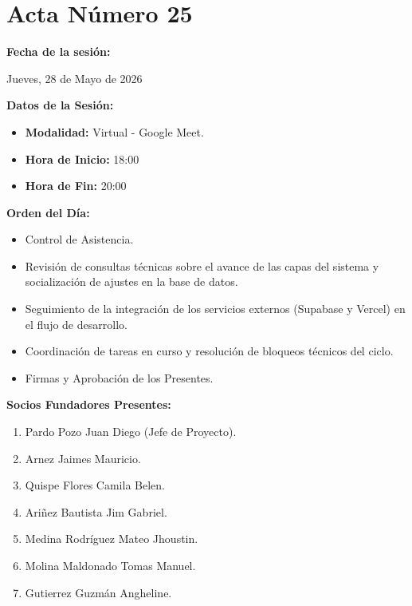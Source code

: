 \newpage
\section{Acta Número 25}
\label{sec:acta25}

\noindent \textbf{Fecha de la sesión:}\par
Jueves, 28 de Mayo de 2026

\vspace*{0.5cm}
\noindent \textbf{Datos de la Sesión:}
\vspace{-0.2cm}
\begin{itemize}[noitemsep]
\item \textbf{Modalidad:} Virtual - Google Meet.
\item \textbf{Hora de Inicio:} 18:00
\item \textbf{Hora de Fin:} 20:00
\end{itemize}

\vspace*{0.5cm}
\noindent \textbf{Orden del Día:}
\vspace{-0.2cm}
\begin{itemize}[noitemsep]
\item Control de Asistencia.
\item Revisión de consultas técnicas sobre el avance de las capas del sistema y socialización de ajustes en la base de datos.
\item Seguimiento de la integración de los servicios externos (Supabase y Vercel) en el flujo de desarrollo.
\item Coordinación de tareas en curso y resolución de bloqueos técnicos del ciclo.
\item Firmas y Aprobación de los Presentes.
\nobreak\end{itemize}

\vspace*{0.5cm}
\noindent \textbf{Socios Fundadores Presentes:}
\vspace{-0.2cm}
\begin{enumerate}[noitemsep]
\item Pardo Pozo Juan Diego (Jefe de Proyecto).
\item Arnez Jaimes Mauricio.
\item Quispe Flores Camila Belen.
\item Ariñez Bautista Jim Gabriel.
\item Medina Rodríguez Mateo Jhoustin.
\item Molina Maldonado Tomas Manuel.
\item Gutierrez Guzmán Angheline.
\end{enumerate}

